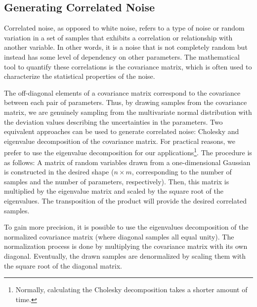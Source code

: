 \documentclass[12pt, TexShade, letterpaper]{report}
\begin{document}
\subsection{Generating Correlated Noise}
\label{chap:method,sub:correlated noise}
Correlated noise, as opposed to white noise, refers to a type of noise or random variation in a set of samples that exhibits a correlation or relationship with another variable. In other words, it is a noise that is not completely random but instead has some level of dependency on other parameters. The mathematical tool to quantify these correlations is the covariance matrix, which is often used to characterize the statistical properties of the noise. \par
The off-diagonal elements of a covariance matrix correspond to the covariance between each pair of parameters. Thus, by drawing samples from the covariance matrix, we are genuinely sampling from the multivariate normal distribution with the deviation values describing the uncertainties in the parameters.
Two equivalent approaches can be used to generate correlated noise: Cholesky and eigenvalue decomposition of the covariance matrix. For practical reasons, we prefer to use the eigenvalue decomposition for our applications\footnote{Normally, calculating the Cholesky decomposition takes a shorter amount of time.}. The procedure is as follows: A matrix of random variables drawn from a one-dimensional Gaussian is constructed in the desired shape ($n \times m$, corresponding to the number of samples and the number of parameters, respectively). Then, this matrix is multiplied by the eigenvalue matrix and scaled by the square root of the eigenvalues. The transposition of the product will provide the desired correlated samples. \par
To gain more precision, it is possible to use the eigenvalues decomposition of the normalized covariance matrix (where diagonal samples all equal unity). The normalization process is done by multiplying the covariance matrix with its own diagonal. Eventually, the drawn samples are denormalized by scaling them with the square root of the diagonal matrix.\par
\end{document}
